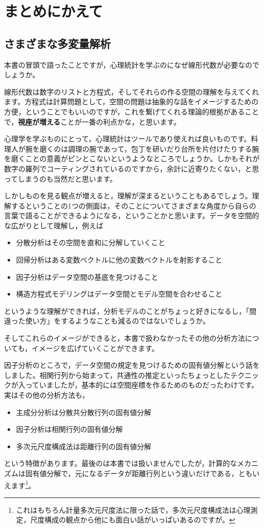 \documentclass{ltjsbook}
\begin{document}
\chapter{まとめにかえて}
\label{L10_AndSoOn}
\section{さまざまな多変量解析}

本書の冒頭で語ったことですが，心理統計を学ぶのになぜ線形代数が必要なのでしょうか。

線形代数は数字のリストと方程式，そしてそれらの作る空間の理解を与えてくれます。方程式は計算問題として，空間の問題は抽象的な話をイメージするための方便，ということでもいいのですが，これを繋げてくれる理論的根拠があることで，\textbf{視座が増える}ことが一番の利点かな，と思います。

心理学を学ぶものにとって，心理統計はツールであり使えれば良いものです。料理人が腕を磨くのは調理の腕であって，包丁を研いだり台所を片付けたりする腕を磨くことの意義がピンとこないというようなところでしょうか。しかもそれが数字の羅列でコーティングされているのですから，余計に近寄りたくない，と思ってしまうのも当然だと思います。

しかしものを見る観点が増えると，理解が深まるということもあるでしょう。理解するということの1つの側面は，そのことについてさまざまな角度から自らの言葉で語ることができるようになる，ということかと思います。データを空間的な広がりとして理解し，例えば
\begin{itemize}
	\item 分散分析はその空間を直和に分解していくこと
	\item 回帰分析はある変数ベクトルに他の変数ベクトルを射影すること
	\item 因子分析はデータ空間の基底を見つけること
	\item 構造方程式モデリングはデータ空間とモデル空間を合わせること
\end{itemize}
というような理解ができれば，分析モデルのことがちょっと好きになるし，「間違った使い方」をするようなことも減るのではないでしょうか。

そしてこれらのイメージができると，本書で扱わなかったその他の分析方法についても，イメージを広げていくことができます。

因子分析のところで，データ空間の規定を見つけるための固有値分解という話をしました。相関行列から始まって，共通性の推定といったちょっとしたテクニックが入っていましたが，基本的には空間座標を作るためのものだったわけです。実はその他の分析方法も，
\begin{itemize}
	\item 主成分分析は分散共分散行列の固有値分解
	\item 因子分析は相関行列の固有値分解
	\item 多次元尺度構成法は距離行列の固有値分解
\end{itemize}
という特徴があります。最後のは本書では扱いませんでしたが，計算的なメカニズムは固有値分解で，元になるデータが距離行列という違いだけである，ともいえます\footnote{これはもちろん計量多次元尺度法に限った話で，多次元尺度構成法は心理測定，尺度構成の観点から他にも面白い話がいっぱいあるのですが。}。
\end{document}

